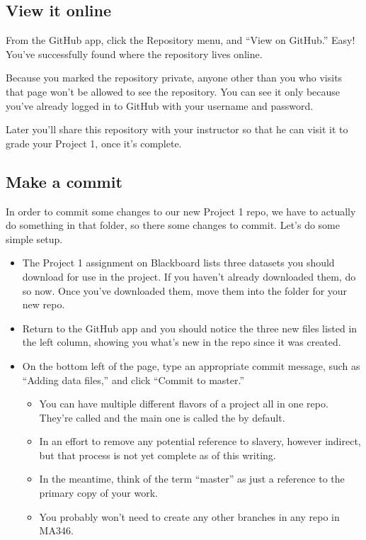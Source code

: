 \documentclass[letterpaper,10pt,english]{sphinxmanual}
\begin{document}
\subsection{View it online}
\label{\detokenize{chapter-8-version-control:view-it-online}}
From the GitHub app, click the Repository menu, and “View on GitHub.”  Easy!  You’ve successfully found where the repository lives online.

Because you marked the repository private, anyone other than you who visits that page won’t be allowed to see the repository.  You can see it only because you’ve already logged in to GitHub with your username and password.

Later you’ll share this repository with your instructor so that he can visit it to grade your Project 1, once it’s complete.


\subsection{Make a commit}
\label{\detokenize{chapter-8-version-control:make-a-commit}}
In order to commit some changes to our new Project 1 repo, we have to actually do something in that folder, so there  some changes to commit.  Let’s do some simple setup.
\begin{itemize}
\item {} 
The Project 1 assignment on Blackboard lists three datasets you should download for use in the project.  If you haven’t already downloaded them, do so now.  Once you’ve downloaded them, move them into the folder for your new repo.

\item {} 
Return to the GitHub app and you should notice the three new files listed in the left column, showing you what’s new in the repo since it was created.

\item {} 
On the bottom left of the page, type an appropriate commit message, such as “Adding data files,” and click “Commit to master.”
\begin{itemize}
\item {} 
You can have multiple different flavors of a project all in one repo.  They’re called  and the main one is called the  by default.

\item {} 
In an effort to remove any potential reference to slavery, however indirect,  but that process is not yet complete as of this writing.

\item {} 
In the meantime, think of the term “master” as just a reference to the primary copy of your work.

\item {} 
You probably won’t need to create any other branches in any repo in MA346.

\end{itemize}

\end{itemize}
\end{document}
